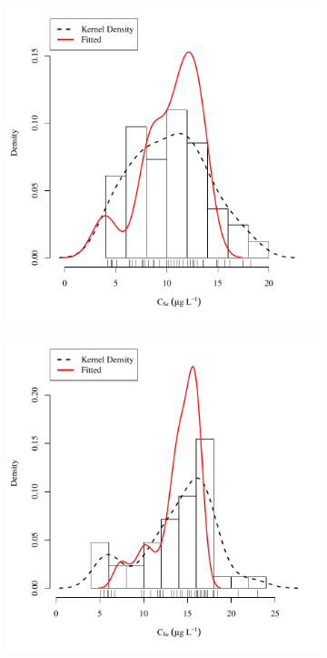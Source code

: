 \begin{linenumbers}
\subfiguretop
\begin{landscape}
	\begin{figure}
		\begin{subfigure}{0.7\textwidth}
			\centering
			\includegraphics[width=\tableCustomSize]{"Figures/Results_DSR/Stochastic/Conc Model ResDist D101C"}
		\end{subfigure}%
		\begin{subfigure}{0.7\textwidth}
			\centering
			\includegraphics[width=\tableCustomSize]{"Figures/Results_DSR/Stochastic/Conc Model ResDist D106C"}

\end{subfigure}
\end{figure}
\end{landscape}
\end{linenumbers}
